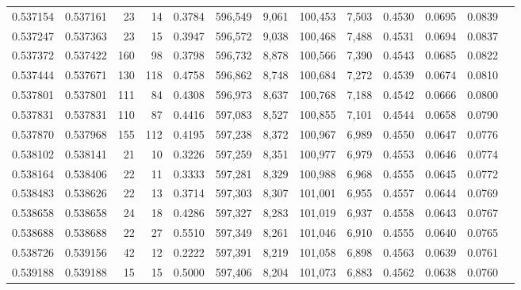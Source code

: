 \begin{tabular}{rrrrrrrrrrrrr}
0.537154 & 0.537161 &    23 &    14 &                                     0.3784 & 596,549 &   9,061 & 100,453 &   7,503 & 0.4530 & 0.0695 & 0.0839 \\
0.537247 & 0.537363 &    23 &    15 &                                     0.3947 & 596,572 &   9,038 & 100,468 &   7,488 & 0.4531 & 0.0694 & 0.0837 \\
0.537372 & 0.537422 &   160 &    98 &                                     0.3798 & 596,732 &   8,878 & 100,566 &   7,390 & 0.4543 & 0.0685 & 0.0822 \\
0.537444 & 0.537671 &   130 &   118 &                                     0.4758 & 596,862 &   8,748 & 100,684 &   7,272 & 0.4539 & 0.0674 & 0.0810 \\
0.537801 & 0.537801 &   111 &    84 &                                     0.4308 & 596,973 &   8,637 & 100,768 &   7,188 & 0.4542 & 0.0666 & 0.0800 \\
0.537831 & 0.537831 &   110 &    87 &                                     0.4416 & 597,083 &   8,527 & 100,855 &   7,101 & 0.4544 & 0.0658 & 0.0790 \\
0.537870 & 0.537968 &   155 &   112 &                                     0.4195 & 597,238 &   8,372 & 100,967 &   6,989 & 0.4550 & 0.0647 & 0.0776 \\
0.538102 & 0.538141 &    21 &    10 &                                     0.3226 & 597,259 &   8,351 & 100,977 &   6,979 & 0.4553 & 0.0646 & 0.0774 \\
0.538164 & 0.538406 &    22 &    11 &                                     0.3333 & 597,281 &   8,329 & 100,988 &   6,968 & 0.4555 & 0.0645 & 0.0772 \\
0.538483 & 0.538626 &    22 &    13 &                                     0.3714 & 597,303 &   8,307 & 101,001 &   6,955 & 0.4557 & 0.0644 & 0.0769 \\
0.538658 & 0.538658 &    24 &    18 &                                     0.4286 & 597,327 &   8,283 & 101,019 &   6,937 & 0.4558 & 0.0643 & 0.0767 \\
0.538688 & 0.538688 &    22 &    27 &                                     0.5510 & 597,349 &   8,261 & 101,046 &   6,910 & 0.4555 & 0.0640 & 0.0765 \\
0.538726 & 0.539156 &    42 &    12 &                                     0.2222 & 597,391 &   8,219 & 101,058 &   6,898 & 0.4563 & 0.0639 & 0.0761 \\
0.539188 & 0.539188 &    15 &    15 &                                     0.5000 & 597,406 &   8,204 & 101,073 &   6,883 & 0.4562 & 0.0638 & 0.0760 \\

\end{tabular}

